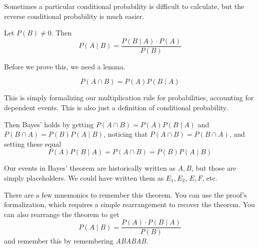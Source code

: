 \documentclass[main.tex]{subfiles}
\begin{document}
Sometimes a particular conditional probability is difficult to calculate, but the reverse conditional probability is much easier.

\begin{thm}
	Let \(P(B) \neq 0\). Then \[P(A \mid B) = \frac{P(B \mid A) \cdot P(A)}{P(B)}\]
\end{thm}

Before we prove this, we need a lemma.

\begin{prop}
	\[P(A \cap B) = P(A)P(B \mid A)\]
\end{prop}

This is simply formalizing our multiplication rule for probabilities, accounting for dependent events.
This is also just a definition of conditional probability.

Then Bayes' holds by getting \(P(A \cap B) = P(A)P(B \mid A)\) and \(P(B \cap A) = P(B)P(A \mid B)\), noticing that \(P(A \cap B) = P(B \cap A)\), and setting these equal \[P(A)P(B \mid A) = P(A \cap B) = P(B)P(A \mid B)\]

\begin{rem}
	Our events in Bayes' theorem are historically written as \(A,B\), but those are simply placeholders. We could have written them as \(E_1,E_2\), \(E,F\), etc.
\end{rem}

\begin{rem}
	There are a few mnemonics to remember this theorem. You can use the proof's formalization, which requires a simple rearrangement to recover the theorem. You can also rearrange the theorem to get \[P(A \mid B) = \frac{P(A) \cdot P(B \mid A)}{P(B)}\] and remember this by remembering \textit{ABABAB}.
\end{rem}
\end{document}
